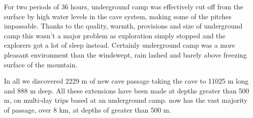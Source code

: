 For two periods of 36 hours, underground camp was effectively cut off
from the surface by high water levels in the cave system, making some of
the pitches impassable. Thanks to the quality, warmth, provisions and
size of underground camp this wasn't a major problem as exploration
simply stopped and the explorers got a lot of sleep instead. Certainly
underground camp was a more pleasant environment than the windswept,
rain lashed and barely above freezing surface of the mountain.

In all we discovered 2229 m of new cave passage taking the cave to 11025
m long and 888 m deep. All these extensions have been made at depths
greater than 500 m, on multi-day trips based at an underground camp.
 now has the vast majority of passage, over 8 km, at
depths of greater than 500 m.
